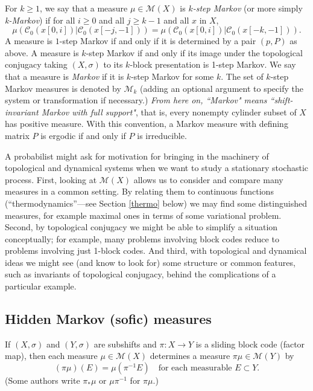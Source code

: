 \documentclass{kepart2010}
\theoremstyle{plain}
\theoremstyle{definition}
\theoremstyle{remark}
\theoremstyle{definition}
\numberwithin{equation}{section}
\begin{document}
For $k \geq 1$, we say that a measure $\mu \in {{\mathcal M}}(X)$ is
{\em
$k$-step Markov}
(or more simply
{\em k-Markov})
 if for all $i \geq 0$ and all $j \geq k-1$
and all $x$ in $X$,
 \begin{equation}
\mu({{\mathcal C}}_0(x[0,i])|{{\mathcal C}}_0(x[-j,-1]))=\mu({{\mathcal C}}_0(x[0,i])|{{\mathcal C}}_0(x[-k,-1])).
\end{equation} A measure is $1$-step Markov if and only if it is determined by
a {}{ pair $(p,P)$ } as above. A measure is $k$-step Markov if and
only if its image under the topological conjugacy taking
$(X,\sigma)$ to its $k$-block presentation is 1-step Markov. We say
that a measure is {\em Markov} if it is $k$-step Markov for some
$k$. The set of $k$-step Markov measures is denoted by ${{\mathcal M}}_k$
(adding an optional argument to specify the system or transformation
if necessary.) {\em From here on, ``Markov" means ``shift-invariant
Markov with full support"}, that is, every nonempty cylinder subset
of $X$ has positive measure. {}{With this convention, a Markov
measure with defining matrix $P$ is ergodic if and only if $P$ is
irreducible.}

A probabilist might ask for  motivation for bringing  in the
machinery of topological and dynamical systems when we want to study
a  stationary stochastic process. First, looking at ${{\mathcal M}}(X)$ allows
us to consider and compare many measures in a common setting. By
relating them to continuous functions (``thermodynamics''---see
Section \ref{thermo} below) we may find some distinguished measures,
for example maximal ones in terms of some variational problem.
Second, by topological conjugacy we might be able to simplify a
situation conceptually; for example,  many problems involving block
codes reduce to problems involving just 1-block codes. And third,
with topological and dynamical ideas we might see (and know to look
for) some structure or common features, such as invariants of
topological conjugacy, behind the complications of a particular
example.

\subsection{Hidden Markov (sofic) measures}\label{sec_hmms}

If $(X,\sigma)$ and $(Y,\sigma)$ are subshifts and $\pi: X \to Y$ is
a sliding block code (factor map), then each measure $\mu \in
{{\mathcal M}}(X)$ determines a measure $\pi \mu \in {{\mathcal M}}(Y)$ by
 \begin{equation} (\pi\mu)(E) =\mu(\pi^{-1}E) \quad\text{for each measurable } E \subset Y .
 \end{equation}
(Some authors write $\pi_*\mu$
or  $\mu\pi^{-1}$
for $\pi\mu$.)
\end{document}
